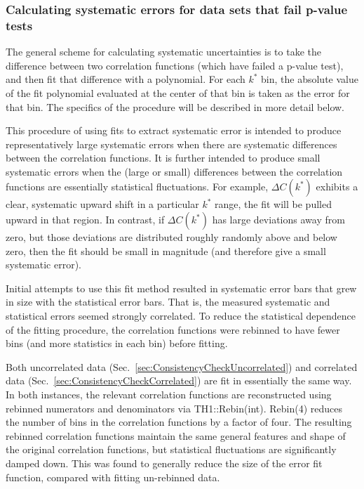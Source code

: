 \subsubsection{Calculating systematic errors for data sets that fail p-value tests}
\label{sec:CalculatingSysErrors}

The general scheme for calculating systematic uncertainties is to take the difference between two correlation functions (which have failed a p-value test), and then fit that difference with a polynomial.  
For each $k^*$ bin, the absolute value of the fit polynomial evaluated at the center of that bin is taken as the error for that bin.  
The specifics of the procedure will be described in more detail below.

This procedure of using fits to extract systematic error is intended to produce representatively large systematic errors when there are systematic differences between the correlation functions.  
It is further intended to produce small systematic errors when the (large or 
small) differences between the correlation functions are essentially statistical fluctuations.  
For example, $\Delta C(k^*)$ exhibits a clear, systematic upward shift in a particular $k^*$ range, the fit will be pulled upward in that region. 
In contrast, if $\Delta C(k^*)$ has large deviations away from zero, but those deviations are distributed roughly randomly above and below zero, then the fit should be small in magnitude (and therefore give a small systematic error).   

Initial attempts to use this fit method resulted in systematic error bars that grew in size with the statistical error bars.  
That is, the measured systematic and statistical errors seemed strongly correlated.  
To reduce the statistical dependence of the fitting procedure, the correlation functions were rebinned to have fewer bins (and more statistics in each bin) before fitting.

Both uncorrelated data (Sec.\ \ref{sec:ConsistencyCheckUncorrelated}) and correlated data (Sec.\ \ref{sec:ConsistencyCheckCorrelated}) are fit in essentially the same way.  
In both instances, the relevant correlation functions are reconstructed using rebinned numerators and denominators via TH1::Rebin(int).  Rebin(4) reduces the number of bins in the correlation functions by a factor of four.  
The resulting rebinned correlation functions maintain the same general features and shape of the original correlation functions, but statistical fluctuations are significantly damped down. 
This was found to generally reduce the size of the error fit function, compared with fitting un-rebinned data.  

